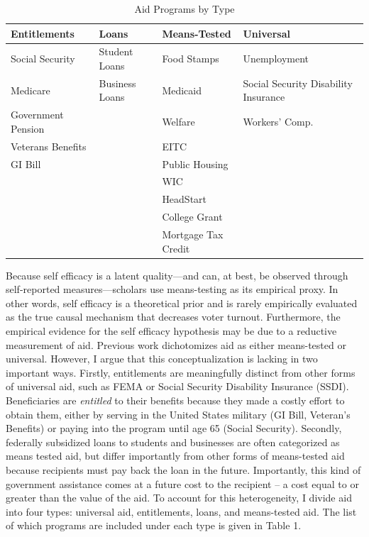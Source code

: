 \documentclass[12pt]{paper}
\begin{document}
\begin{table}[H]
	\begin{adjustbox}{width=1\textwidth}
		\begin{tabular}{llll}
			\hline
			\textbf{Entitlements} & \textbf{Loans} & \textbf{Means-Tested} & \textbf{Universal}                   \\ \hline
			Social Security       & Student Loans  & Food Stamps           & Unemployment                         \\
			Medicare              & Business Loans & Medicaid              & Social Security Disability Insurance \\
			Government Pension    &                & Welfare               & Workers' Comp.                       \\
			Veterans Benefits     &                & EITC                  &                                      \\
			GI Bill               &                & Public Housing        &                                      \\
			&                & WIC                   &                                      \\
			&                & HeadStart             &                                      \\
			&                & College Grant         &                                      \\
			&                & Mortgage Tax Credit   &                                      \\ \hline
		\end{tabular}
	\end{adjustbox}
	\caption{Aid Programs by Type} 
	\label{}
\end{table}
Because self efficacy is a latent quality—and can, at best, be observed through self-reported measures—scholars use means-testing as its empirical proxy. In other words, self efficacy is a theoretical prior and is rarely empirically evaluated as the true causal mechanism that decreases voter turnout. Furthermore, the empirical evidence for the self efficacy hypothesis may be due to a reductive measurement of aid. Previous work dichotomizes aid as either means-tested or universal. However, I argue that this conceptualization is lacking in two important ways. Firstly, entitlements are meaningfully distinct from other forms of universal aid, such as FEMA or Social Security Disability Insurance (SSDI). Beneficiaries are \textit{entitled} to their benefits because they made a costly effort to obtain them, either by serving in the United States military (GI Bill, Veteran's Benefits) or paying into the program until age 65 (Social Security). Secondly, federally subsidized loans to students and businesses are often categorized as means tested aid, but differ importantly from other forms of means-tested aid because recipients must pay back the loan in the future. Importantly, this kind of government assistance comes at a future cost to the recipient – a cost equal to or greater than the value of the aid. To account for this heterogeneity, I divide aid into four types: universal aid, entitlements, loans, and means-tested aid. The list of which programs are included under each type is given in Table 1.
\end{document}
